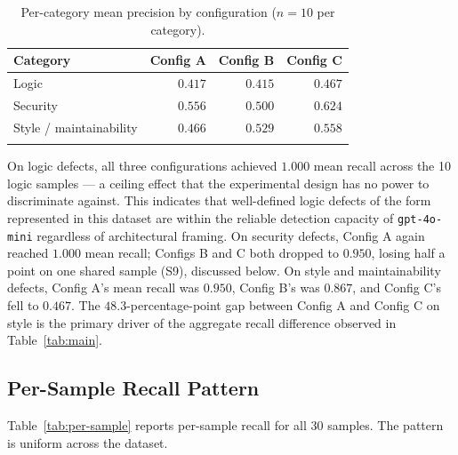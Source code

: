\documentclass[pdflatex,sn-mathphys-num]{sn-jnl}
\theoremstyle{thmstyleone}
\theoremstyle{thmstyletwo}
\theoremstyle{thmstylethree}
\begin{document}
\begin{table}[ht]
\caption{Per-category mean precision by configuration ($n=10$ per category).}
\label{tab:cat-precision}
\begin{tabular}{@{}lrrr@{}}
\toprule
Category & Config A & Config B & Config C \\
\midrule
Logic                    & $0.417$ & $0.415$ & $0.467$ \\
Security                 & $0.556$ & $0.500$ & $0.624$ \\
Style / maintainability  & $0.466$ & $0.529$ & $0.558$ \\
\botrule
\end{tabular}
\end{table}

On logic defects, all three configurations achieved $1.000$ mean recall across the 10 logic samples --- a ceiling effect that the experimental design has no power to discriminate against. This indicates that well-defined logic defects of the form represented in this dataset are within the reliable detection capacity of \texttt{gpt-4o-mini} regardless of architectural framing. On security defects, Config A again reached $1.000$ mean recall; Configs B and C both dropped to $0.950$, losing half a point on one shared sample (S9), discussed below. On style and maintainability defects, Config A's mean recall was $0.950$, Config B's was $0.867$, and Config C's fell to $0.467$. The $48.3$-percentage-point gap between Config A and Config C on style is the primary driver of the aggregate recall difference observed in Table~\ref{tab:main}.

\subsection{Per-Sample Recall Pattern}

Table~\ref{tab:per-sample} reports per-sample recall for all 30 samples. The pattern is uniform across the dataset.
\end{document}

